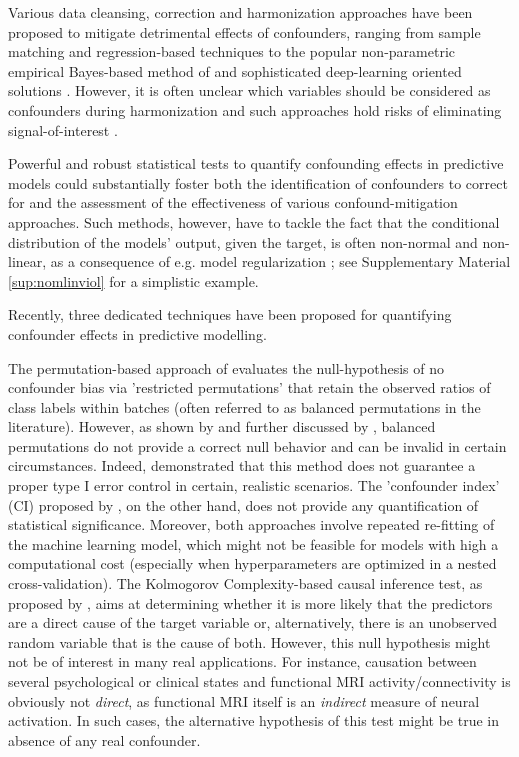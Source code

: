 \documentclass{article}
\begin{document}
Various data cleansing, correction and harmonization approaches have been proposed to mitigate detrimental effects of confounders, ranging from sample matching \citep{rao2017predictive} and regression-based techniques \citep{dukart2011age, spisak2014voxel, abdulkadir2014reduction, rao2017predictive} to the popular non-parametric empirical Bayes-based method of \cite{johnson2007adjusting} and sophisticated deep-learning oriented solutions \citep{zhao2020training, hognon2019standardization}. However, it is often unclear which variables should be considered as confounders during harmonization and such approaches hold risks of eliminating signal-of-interest \citep{wachinger2021detect}.

Powerful and robust statistical tests to quantify confounding effects in predictive models could substantially foster both the identification of confounders to correct for and the assessment of the effectiveness of various confound-mitigation approaches. Such methods, however, have to tackle the fact that the conditional distribution of the models' output, given the target, is often non-normal and non-linear, as a consequence of e.g. model regularization \citep{garcia2009study, kristensen2017whole}; see Supplementary Material \ref{sup:nomlinviol} for a simplistic example.

Recently, three dedicated techniques \citep{chaibub2019permutation, ferrari2020measuring, wachinger2021detect} have been proposed for quantifying confounder effects in predictive modelling.

The permutation-based approach of \cite{chaibub2019permutation} evaluates the null-hypothesis of no confounder bias via 'restricted permutations' that retain the observed ratios of class labels within batches (often referred to as balanced permutations in the literature). However, as shown by \cite{southworth2009properties} and further discussed by \cite{hemerik2018exact}, balanced permutations do not provide a correct null behavior and can be invalid in certain circumstances. Indeed, \cite{ferrari2020measuring} demonstrated that this method does not guarantee a proper type I error control in certain, realistic scenarios.
The 'confounder index' (CI) proposed by \cite{ferrari2020measuring}, on the other hand, does not provide any quantification of statistical significance.
Moreover, both approaches involve repeated re-fitting of the machine learning model, which might not be feasible for models with high a computational cost (especially when hyperparameters are optimized in a nested cross-validation).
The Kolmogorov Complexity-based causal inference test, as proposed by \cite{wachinger2021detect}, aims at determining whether it is more likely that the predictors are a direct cause of the target variable or, alternatively, there is an unobserved random variable that is the cause of both. However, this null hypothesis might not be of interest in many real applications. For instance, causation between several psychological or clinical states and functional MRI activity/connectivity is obviously not \emph{direct}, as functional MRI itself is an \emph{indirect} measure of neural activation. In such cases, the alternative hypothesis of this test might be true in absence of any real confounder.
\end{document}
